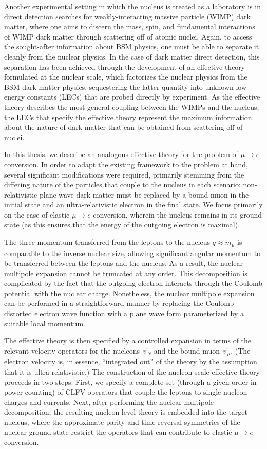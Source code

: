 \documentclass{book}[letterpaper,12pt]
\begin{document}
Another experimental setting in which the nucleus is treated as a laboratory is in direct detection searches for weakly-interacting massive particle (WIMP) dark matter, where one aims to discern the mass, spin, and fundamental interactions of WIMP dark matter through scattering off of atomic nuclei. Again, to access the sought-after information about BSM physics, one must be able to separate it cleanly from the nuclear physics. In the case of dark matter direct detection, this separation has been achieved through the development of an effective theory formulated at the nuclear scale, which factorizes the nuclear physics from the BSM dark matter physics, sequestering the latter quantity into unknown low-energy constants (LECs) that are probed directly by experiment. As the effective theory describes the most general coupling between the WIMPs and the nucleus, the LECs that specify the effective theory represent the maximum information about the nature of dark matter that can be obtained from scattering off of nuclei. 

In this thesis, we describe an analogous effective theory for the problem of $\mu\rightarrow e$ conversion. In order to adapt the existing framework to the problem at hand, several significant modifications were required, primarily stemming from the differing nature of the particles that couple to the nucleus in each scenario: non-relativistic plane-wave dark matter must be replaced by a bound muon in the initial state and an ultra-relativistic electron in the final state. We focus primarily on the case of elastic $\mu\rightarrow e$ conversion, wherein the nucleus remains in its ground state (as this ensures that the energy of the outgoing electron is maximal).  

The three-momentum transferred from the leptons to the nucleus $q\approx m_{\mu}$ is comparable to the inverse nuclear size, allowing significant angular momentum to be transferred between the leptons and the nucleus. As a result, the nuclear multipole expansion cannot be truncated at any order. This decomposition is complicated by the fact that the outgoing electron interacts through the Coulomb potential with the nuclear charge. Nonetheless, the nuclear multipole expansion can be performed in a straightforward manner by replacing the Coulomb-distorted electron wave function with a plane wave form parameterized by a suitable local momentum.

The effective theory is then specified by a controlled expansion in terms of the relevant velocity operators for the nucleons $\vec{v}_N$ and the bound muon $\vec{v}_{\mu}$. (The electron velocity is, in essence, ``integrated out'' of the theory by the assumption that it is ultra-relativistic.) The construction of the nucleon-scale effective theory proceeds in two steps: First, we specify a complete set (through a given order in power-counting) of CLFV operators that couple the leptons to single-nucleon charges and currents. Next, after performing the nuclear multipole decomposition, the resulting nucleon-level theory is embedded into the target nucleus, where the approximate parity and time-reversal symmetries of the nuclear ground state restrict the operators that can contribute to elastic $\mu\rightarrow e$ conversion. 
\end{document}
